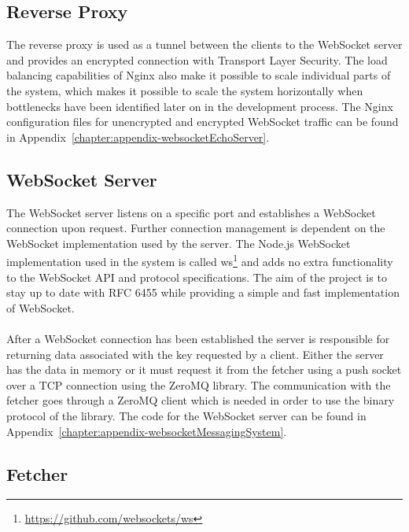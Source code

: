 \subsection{Reverse Proxy}

The reverse proxy is used as a tunnel between the clients to the WebSocket server and provides an encrypted connection with Transport Layer Security. The load balancing capabilities of Nginx also make it possible to scale individual parts of the system, which makes it possible to scale the system horizontally when bottlenecks have been identified later on in the development process. The Nginx configuration files for unencrypted and encrypted WebSocket traffic can be found in Appendix~\ref{chapter:appendix-websocketEchoServer}.


\subsection{WebSocket Server}

The WebSocket server listens on a specific port and establishes a WebSocket connection upon request. Further connection management is dependent on the WebSocket implementation used by the server. The Node.js WebSocket implementation used in the system is called ws\footnote{\url{https://github.com/websockets/ws}} and adds no extra functionality to the WebSocket API and protocol specifications. The aim of the project is to stay up to date with RFC 6455 while providing a simple and fast implementation of WebSocket.
\\ \\
After a WebSocket connection has been established the server is responsible for returning data associated with the key requested by a client. Either the server has the data in memory or it must request it from the fetcher using a push socket over a TCP connection using the ZeroMQ library. The communication with the fetcher goes through a ZeroMQ client which is needed in order to use the binary protocol of the library. The code for the WebSocket server can be found in Appendix~\ref{chapter:appendix-websocketMessagingSystem}.

\subsection{Fetcher}

